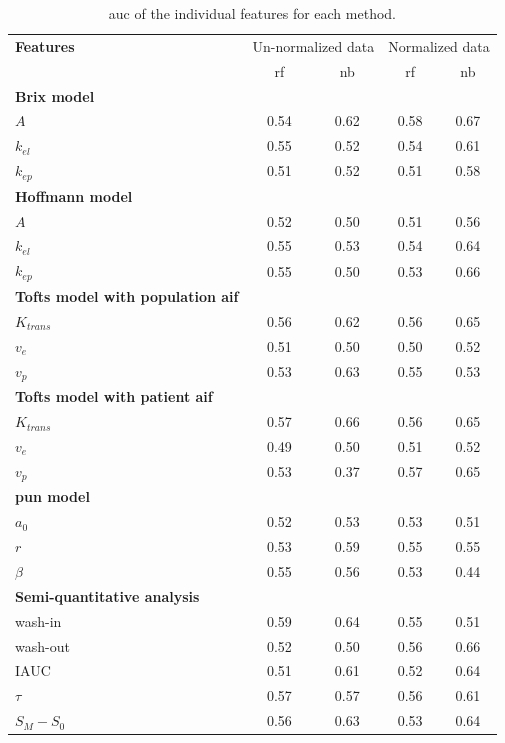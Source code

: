 \begin{table}
  \caption{\acs*{auc} of the individual features for each method.}
  \centering
  \begin{tabular}{l c c c c}
    \toprule
    \textbf{Features} & \multicolumn{2}{c}{Un-normalized data} & \multicolumn{2}{c}{Normalized data} \\
    & \acs*{rf} & \acs*{nb} & \acs*{rf} & \acs*{nb} \\
    \midrule
    \textbf{Brix model} & & & & \\
    \quad $A$         & 0.54 & 0.62 & 0.58 & 0.67 \\
    \quad $k_{el}$    & 0.55 & 0.52 & 0.54 & 0.61 \\
    \quad $k_{ep}$    & 0.51 & 0.52 & 0.51 & 0.58 \\
    \textbf{Hoffmann model} & & & & \\
    \quad $A$         & 0.52 & 0.50 & 0.51 & 0.56 \\
    \quad $k_{el}$    & 0.55 & 0.53 & 0.54 & 0.64 \\
    \quad $k_{ep}$    & 0.55 & 0.50 & 0.53 & 0.66 \\
    \textbf{Tofts model with population \ac{aif}} & & & & \\
    \quad $K_{trans}$ & 0.56 & 0.62 & 0.56 & 0.65 \\
    \quad $v_{e}$     & 0.51 & 0.50 & 0.50 & 0.52 \\
    \quad $v_{p}$     & 0.53 & 0.63 & 0.55 & 0.53 \\
    \textbf{Tofts model with patient \ac{aif}} & & & & \\
    \quad $K_{trans}$ & 0.57 & 0.66 & 0.56 & 0.65 \\
    \quad $v_{e}$     & 0.49 & 0.50 & 0.51 & 0.52 \\
    \quad $v_{p}$     & 0.53 & 0.37 & 0.57 & 0.65 \\
    \textbf{\ac{pun} model} & & & & \\
    \quad $a_0$       & 0.52 & 0.53 & 0.53 & 0.51  \\
    \quad $r$         & 0.53 & 0.59 & 0.55 & 0.55 \\
    \quad $\beta$     & 0.55 & 0.56 & 0.53 & 0.44 \\
    \textbf{Semi-quantitative analysis} & & & & \\
    \quad wash-in     & 0.59 & 0.64 & 0.55 & 0.51 \\
    \quad wash-out    & 0.52 & 0.50 & 0.56 & 0.66 \\
    \quad IAUC        & 0.51 & 0.61 & 0.52 & 0.64 \\
    \quad $\tau$      & 0.57 & 0.57 & 0.56 & 0.61 \\
    \quad $S_M - S_0$ & 0.56 & 0.63 & 0.53 & 0.64 \\
    \bottomrule
  \end{tabular}
  \label{tab:resfeats}
\end{table}

